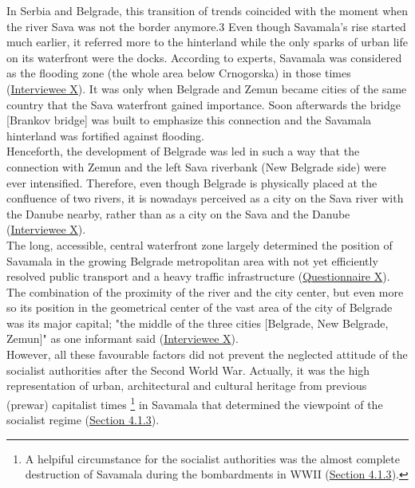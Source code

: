 \documentclass[11pt]{report}
\begin{document}
{{{{In Serbia and Belgrade, this transition of trends coincided with the moment when the river Sava was not the border anymore.3 Even though Savamala’s rise started much earlier, it referred more to the hinterland while the only sparks of urban life on its waterfront were the docks. According to experts, Savamala was considered as the flooding zone (the whole area below Crnogorska) in those times (\href{InterviewX}{Interviewee X}).
It was only when Belgrade and Zemun became cities of the same country that the Sava waterfront gained importance. Soon afterwards the bridge [Brankov bridge] was built to emphasize this connection and the Savamala hinterland was fortified against flooding.
\\

Henceforth, the development of Belgrade was led in such a way that the connection with Zemun and the left Sava riverbank (New Belgrade side) were ever intensified. Therefore, even though Belgrade is physically placed at the confluence of two rivers, it is nowadays perceived as a city on the Sava river with the Danube nearby, rather than as a city on the Sava and the Danube (\href{InterviewX}{Interviewee X}).
\\

The long, accessible, central waterfront zone largely determined the position of Savamala in the growing Belgrade metropolitan area with not yet efficiently resolved public transport and a heavy traffic infrastructure  (\href{Questionnaire Experts Savamala}{Questionnaire X}).
The combination of the proximity of the river and the city center, but even more so its position in the geometrical center of the vast area of the city of Belgrade was its major capital; "the middle of the three cities [Belgrade, New Belgrade, Zemun]" as one informant said (\href{InterviewX}{Interviewee X}).
\\

However, all these favourable factors did not prevent the neglected attitude of the socialist authorities after the Second World War.
Actually, it was the high representation of urban, architectural and cultural heritage from previous (prewar) capitalist times
\footnote{A helpiful circumstance for the socialist authorities was the almost complete destruction of Savamala during the bombardments in WWII  (\href{Section 4.1.3}{Section 4.1.3}).}
in Savamala that determined the viewpoint of the socialist regime (\href{Section 4.1.3}{Section 4.1.3}).
\\

}}}}
\end{document}
